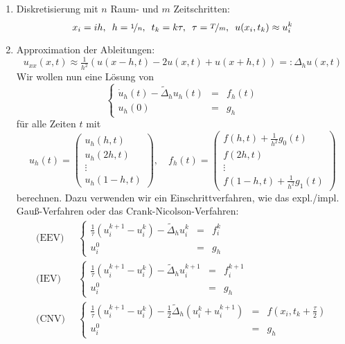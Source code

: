 \documentclass{cheat-sheet}
\newcommand{\Laplace}{\Delta}
\begin{document}
\begin{verf}
  \begin{enumerate}
    \item Diskretisierung mit $n$ Raum- und $m$ Zeitschritten:
    \[
      x_i = ih, \enspace
      h = \nicefrac{1}{n}, \enspace
      t_k = k \tau, \enspace
      \tau = \nicefrac{T}{m}, \enspace
      u(x_i, t_k) \approx u_i^k
    \]
    \item Approximation der Ableitungen:
    \[ u_{xx}(x,t) \approx \tfrac{1}{h^2} \left( u(x-h, t) - 2u(x,t) + u(x+h, t) \right) =: \Laplace_h u(x,t) \]
    Wir wollen nun eine Lösung von
    \[ \left\{ \begin{array}{rll}
      \dot{u}_h(t) - \tilde{\Laplace}_h u_h(t) &=& f_h(t) \\
      u_h(0) &=& g_h
    \end{array} \right. \]
    für alle Zeiten $t$ mit
    \[
      u_h(t) = \begin{pmatrix}
        u_h(h, t) \\
        u_h(2h, t) \\
        \vdots \\
        u_h(1-h,t)
      \end{pmatrix}, \quad
      f_h(t) = \begin{pmatrix}
        f(h, t) + \tfrac{1}{h^2} g_0(t) \\
        f(2h, t) \\
        \vdots \\
        f(1-h,t) + \tfrac{1}{h^2} g_1(t)
      \end{pmatrix}
    \]
    berechnen.
    Dazu verwenden wir ein Einschrittverfahren, wie das expl./impl. Gauß-Verfahren oder das Crank-Nicolson-Verfahren:
    \begin{align*}
      \text{(EEV)} \enspace
      & \left\{ \begin{array}{rcl}
        \tfrac{1}{\tau} (u_i^{k+1} - u_i^k) - \tilde{\Laplace}_h u_i^k &=& f_i^k \\
        u_i^0 &=& g_h
      \end{array} \right. \\
      \text{(IEV)} \enspace
      & \left\{ \begin{array}{rcl}
        \tfrac{1}{\tau} (u_i^{k+1} - u_i^k) - \tilde{\Laplace}_h u_i^{k+1} &=& f_i^{k+1} \\
        u_i^0 &=& g_h
      \end{array} \right. \\
      \text{(CNV)} \enspace
      & \left\{ \begin{array}{rcl}
        \tfrac{1}{\tau} (u_i^{k+1} - u_i^k) - \tfrac{1}{2} \tilde{\Laplace}_h (u_i^k + u_i^{k+1}) &=& f(x_i, t_k + \tfrac{\tau}{2}) \\
        u_i^0 &=& g_h
      \end{array} \right.
    \end{align*}
  \end{enumerate}
\end{verf}
\end{document}
